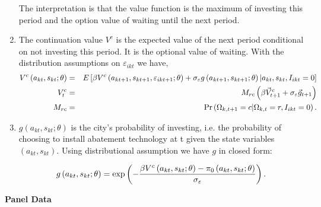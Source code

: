 \documentclass{article}
\begin{document}
\begin{enumerate}
The interpretation is that the value function is the maximum of investing
this period and the option value of waiting until the next period.

\item The continuation value $V^{c}$ is the expected value of the next
period conditional on not investing this period. It is the optional value of
waiting. With the distribution assumptions on $\varepsilon _{ikt}$ we have,%
\begin{eqnarray*}
V^{c}\left( a_{kt},s_{kt};\theta \right) &=&E\left[ \beta V^{c}\left(
a_{kt+1},s_{kt+1},\varepsilon _{ikt+1};\theta \right) +\sigma _{\varepsilon
}g\left( a_{kt+1},s_{kt+1};\theta \right) |a_{kt},s_{kt},I_{ikt}=0\right] \\
V_{t}^{c} &=&M_{rc}\left( \beta \vec{V}_{t+1}^{c}+\sigma _{\varepsilon }\vec{%
g}_{t+1}\right) \\
M_{rc} &=&\Pr \left( \Omega _{k,t+1}=c|\Omega _{k,t}=r,I_{ikt}=0\right) .
\end{eqnarray*}


\item $g\left( a_{kt},s_{kt};\theta \right) $ is the city's probability of
investing, i.e. the probability of choosing to install abatement technology
at t given the state variables $\left( a_{kt},s_{kt}\right) $. Using
distributional assumption we have $g$ in closed form:

\begin{equation*}
g\left( a_{kt},s_{kt};\theta \right) =\exp \left( -\frac{\beta V^{c}\left(
	a_{kt},s_{kt};\theta \right) -\pi _{0}\left( a_{kt},s_{kt};\theta \right) }{%
	\sigma _{\varepsilon }}\right) .
\end{equation*}

\end{enumerate}

\bigskip

\textbf{Panel Data}
\end{document}
